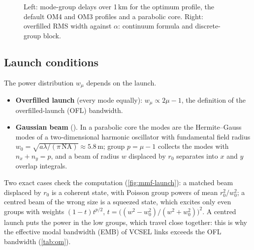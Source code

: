 \begin{figure}[htbp]
\centering
{}
\caption{Left: mode-group delays over 1\,km for the optimum profile, the default OM4 and OM3
profiles and a parabolic core. Right: overfilled RMS width against $\alpha$: continuum formula and
discrete-group block.}
\label{fig:mmf-profile}
\end{figure}

\subsection{Launch conditions}
The power distribution $w_\mu$ depends on the launch.
\begin{itemize}
  \item \textbf{Overfilled launch} (every mode equally): $w_\mu\propto2\mu-1$, the definition of the
  overfilled-launch (OFL) bandwidth.
  \item \textbf{Gaussian beam} (). In a parabolic core the modes are the
  Hermite--Gauss modes of a two-dimensional harmonic oscillator with fundamental field radius
  $w_0=\sqrt{a\lambda/(\pi\,\mathrm{NA})}\approx5.8$\,\textmu m; group $p=\mu-1$ collects the modes with $n_x+n_y=p$, and a
  beam of radius $w$ displaced by $r_0$ separates into $x$ and $y$ overlap integrals.
\end{itemize}
Two exact cases check the computation (\cref{fig:mmf-launch}): a matched beam displaced by $r_0$ is a
coherent state, with Poisson group powers of mean $r_0^2/w_0^2$; a centred beam of the wrong size is a
squeezed state, which excites only even groups with weights $(1-t)t^{p/2}$,
$t=\big((w^2-w_0^2)/(w^2+w_0^2)\big)^2$. A centred launch puts the power in the low groups, which travel
close together: this is why the effective modal bandwidth (EMB) of VCSEL links exceeds the OFL
bandwidth (\cref{tab:om}).

